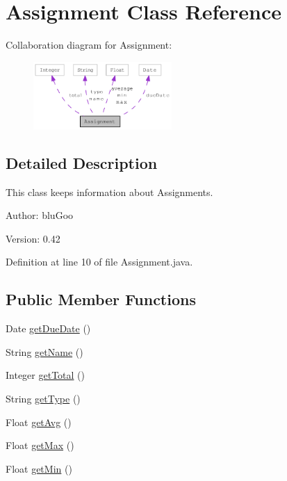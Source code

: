 \hypertarget{classAssignment}{
\section{Assignment Class Reference}
\label{classAssignment}
}
Collaboration diagram for Assignment:\nopagebreak
\begin{figure}[H]
\begin{center}
\leavevmode
\includegraphics[width=149pt]{classAssignment__coll__graph}
\end{center}
\end{figure}


\subsection{Detailed Description}
This class keeps information about Assignments. 

\begin{Desc}
\item[Author:]bluGoo \end{Desc}
\begin{Desc}
\item[Version:]0.42 \end{Desc}


Definition at line 10 of file Assignment.java.\subsection*{Public Member Functions}
\begin{CompactItemize}
\item 
Date \hyperlink{classAssignment_675ad345db48da4e5c76ef8ca6a1d542}{getDueDate} ()
\item 
String \hyperlink{classAssignment_abdd9b24e2bdbe8e0c6001b82656f7a1}{getName} ()
\item 
Integer \hyperlink{classAssignment_3ba879ed33555292e38132d0cc7eae72}{getTotal} ()
\item 
String \hyperlink{classAssignment_68847634255250ce3661e8bcfed61962}{getType} ()
\item 
Float \hyperlink{classAssignment_683f502f320a2d8b4eaff671099759b8}{getAvg} ()
\item 
Float \hyperlink{classAssignment_1b84b20c7651f3ef405f88e22b4fa508}{getMax} ()
\item 
Float \hyperlink{classAssignment_1b65c060cc8f864ee2268d43c0eebf4f}{getMin} ()
\end{CompactItemize}
